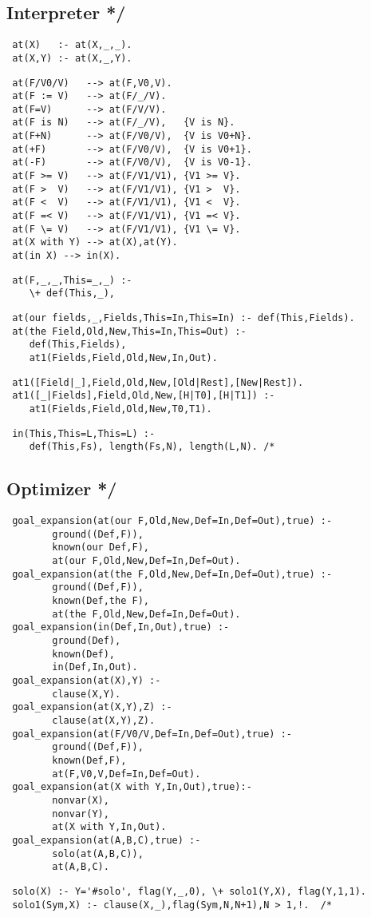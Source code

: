 \documentclass{article}
\begin{document}
\subsection*{Interpreter */\label{Interpreter_}}
\begin{verbatim}
 at(X)   :- at(X,_,_).
 at(X,Y) :- at(X,_,Y).
\end{verbatim}
\begin{verbatim}
 at(F/V0/V)   --> at(F,V0,V). 
 at(F := V)   --> at(F/_/V).
 at(F=V)      --> at(F/V/V). 
 at(F is N)   --> at(F/_/V),   {V is N}.
 at(F+N)      --> at(F/V0/V),  {V is V0+N}.
 at(+F)       --> at(F/V0/V),  {V is V0+1}.
 at(-F)       --> at(F/V0/V),  {V is V0-1}.
 at(F >= V)   --> at(F/V1/V1), {V1 >= V}.
 at(F >  V)   --> at(F/V1/V1), {V1 >  V}.
 at(F <  V)   --> at(F/V1/V1), {V1 <  V}.
 at(F =< V)   --> at(F/V1/V1), {V1 =< V}.
 at(F \= V)   --> at(F/V1/V1), {V1 \= V}.
 at(X with Y) --> at(X),at(Y).
 at(in X) --> in(X).
\end{verbatim}
\begin{verbatim}
 at(F,_,_,This=_,_) :-
    \+ def(This,_),
\end{verbatim}
\begin{verbatim}
 at(our fields,_,Fields,This=In,This=In) :- def(This,Fields).
 at(the Field,Old,New,This=In,This=Out) :-
    def(This,Fields),
    at1(Fields,Field,Old,New,In,Out).
\end{verbatim}
\begin{verbatim}
 at1([Field|_],Field,Old,New,[Old|Rest],[New|Rest]).
 at1([_|Fields],Field,Old,New,[H|T0],[H|T1]) :-
    at1(Fields,Field,Old,New,T0,T1).
\end{verbatim}
\begin{verbatim}
 in(This,This=L,This=L) :- 
    def(This,Fs), length(Fs,N), length(L,N). /*
\end{verbatim}
\subsection*{Optimizer */\label{Optimizer_}}
\begin{verbatim}
 goal_expansion(at(our F,Old,New,Def=In,Def=Out),true) :- 
        ground((Def,F)), 
        known(our Def,F),
        at(our F,Old,New,Def=In,Def=Out).
 goal_expansion(at(the F,Old,New,Def=In,Def=Out),true) :- 
        ground((Def,F)), 
        known(Def,the F),
        at(the F,Old,New,Def=In,Def=Out).
 goal_expansion(in(Def,In,Out),true) :- 
        ground(Def), 
        known(Def),
        in(Def,In,Out). 
 goal_expansion(at(X),Y) :- 
        clause(X,Y).
 goal_expansion(at(X,Y),Z) :- 
        clause(at(X,Y),Z). 
 goal_expansion(at(F/V0/V,Def=In,Def=Out),true) :- 
        ground((Def,F)), 
        known(Def,F),
        at(F,V0,V,Def=In,Def=Out).
 goal_expansion(at(X with Y,In,Out),true):- 
        nonvar(X), 
        nonvar(Y),
        at(X with Y,In,Out).
 goal_expansion(at(A,B,C),true) :- 
        solo(at(A,B,C)),
        at(A,B,C).
\end{verbatim}
\begin{verbatim}
 solo(X) :- Y='#solo', flag(Y,_,0), \+ solo1(Y,X), flag(Y,1,1).
 solo1(Sym,X) :- clause(X,_),flag(Sym,N,N+1),N > 1,!.  /*
\end{verbatim}
\end{document}
